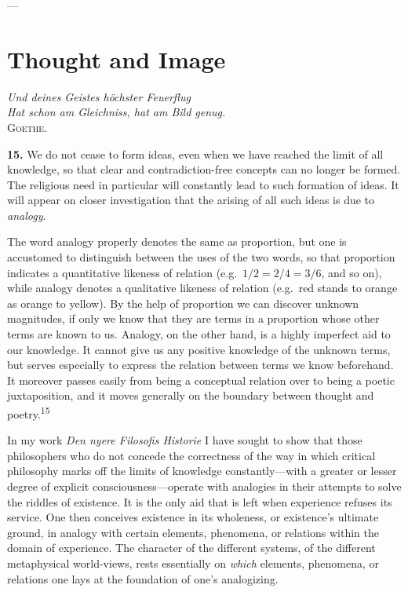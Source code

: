 \documentclass[12pt,a4paper]{book}
\newcommand{\opage}[1]{\marginnote{\footnotesize\textit{[#1]}}}
\begin{document}
\begin{center}---\end{center}

\section{Thought and Image}
\label{sec:thought-image}

\begin{flushright}
\opage{39}
\textit{Und deines Geistes höchster Feuerflug}\\
\textit{Hat schon am Gleichniss, hat am Bild genug.}\\[2pt]
\textsc{Goethe}.
\end{flushright}

\bigskip

\noindent\textbf{15.} We do not cease to form ideas, even when we have
reached the limit of all knowledge, so that clear and contradiction-free
concepts can no longer be formed. The religious need in particular will
constantly lead to such formation of ideas. It will appear on closer
investigation that the arising of all such ideas is due to
\emph{analogy}.

The word analogy properly denotes the same as proportion, but one is
accustomed to distinguish between the uses of the two words, so that
proportion indicates a quantitative likeness of relation (e.g.\ $1/2 = 2/4 =
3/6$, and so on), while analogy denotes a qualitative likeness of relation
(e.g.\ red stands to orange as orange to yellow). By the help of proportion
we can discover unknown magnitudes, if only we know that they are terms in a
proportion whose other terms are known to us. Analogy, on the other hand, is
a highly imperfect aid to our knowledge. It cannot give us any positive
knowledge of the unknown terms, but serves especially to express the relation
between terms we know beforehand. It moreover passes easily from being a
conceptual relation over to being a poetic juxtaposition, and it moves
generally on the boundary between thought and poetry.\textsuperscript{15}

In my work \emph{Den nyere Filosofis Historie} I have sought to show that
those philosophers who do not concede the correctness of the way in which
critical philosophy marks off the limits of knowledge constantly---with a
greater or lesser degree of explicit consciousness---operate with analogies
in their attempts to solve the riddles of existence. It is the only aid that
is left when experience refuses its service. One then conceives existence in
its wholeness, or existence's ultimate ground, in analogy with certain
elements, phenomena, or relations within the domain of experience. The
character of the different systems, of the 
\opage{40}different metaphysical world-views,
rests essentially on \emph{which} elements, phenomena, or relations one lays
at the foundation of one's analogizing.
\end{document}
